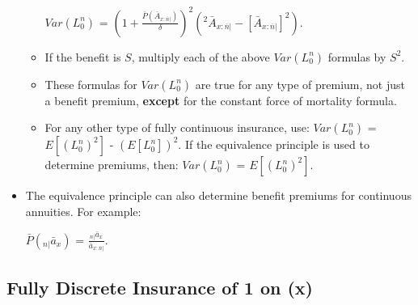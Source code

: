 \documentclass[]{book}
\begin{document}
\begin{itemize}
\begin{itemize}
    \(Var(L^n_0)\) =
    \((1 + \frac{\bar{P}(\bar{A}_{x:\overline{n}|})}{\delta})^2\)\((^2\bar{A}_{x:\overline{n}|} - [\bar{A}_{x:\overline{n}|}]^2)\).
  \item
    If the benefit is \(S\), multiply each of the above \(Var(L^n_0)\)
    formulas by \(S^2\).
  \item
    These formulas for \(Var(L^n_0)\) are true for any type of premium,
    not just a benefit premium, \textbf{except} for the constant force
    of mortality formula.
  \item
    For any other type of fully continuous insurance, use:
    \(Var(L^n_0)\) = \(E[(L^n_0)^2]\) - \((E[L^n_0])^2\). If the
    equivalence principle is used to determine premiums, then:
    \(Var(L^n_0)\) = \(E[(L^n_0)^2]\).
  \end{itemize}
\item
  The equivalence principle can also determine benefit premiums for
  continuous annuities. For example:

  \(\bar{P}({}_{n|}\bar{a}_x)\) =
  \(\frac{{}_{n|}\bar{a}_x}{\bar{a}_{x:\overline{n}|}}\).
\end{itemize}

\subsection{Fully Discrete Insurance of 1 on
(x)}\label{fully-discrete-insurance-of-1-on-x}
\end{document}
